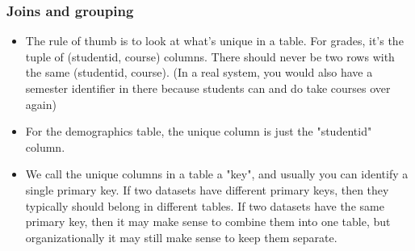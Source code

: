 \begin{frame}[fragile] \frametitle{Joins and grouping}
\begin{itemize}
\item The rule of thumb is to look at what's unique in a table. For grades, it's the tuple of (studentid, course) columns. There should never be two rows with the same (studentid, course). (In a real system, you would also have a semester identifier in there because students can and do take courses over again)

\item For the demographics table, the unique column is just the "studentid" column.

\item We call the unique columns in a table a "key", and usually you can identify a single primary key. If two datasets have different primary keys, then they typically should belong in different tables. If two datasets have the same primary key, then it may make sense to combine them into one table, but organizationally it may still make sense to keep them separate.
\end{itemize}
\end{frame}


